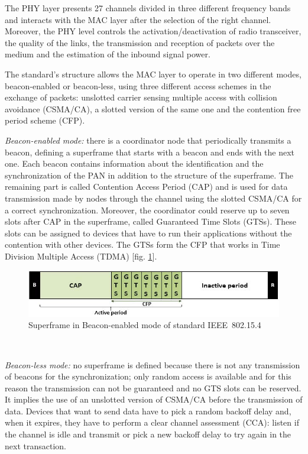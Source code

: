 \documentclass[conference]{IEEEtran}
\begin{document}
The PHY layer presents 27 channels divided in three different frequency bands and interacts with the MAC layer after the selection of the right channel. Moreover, the PHY level controls the activation/deactivation of radio transceiver, the quality of the links, the transmission and reception of packets over the medium and the estimation of the inbound signal power.

The standard's structure allows the MAC layer to operate in two different modes, beacon-enabled or beacon-less, using three different access schemes in the exchange of packets: unslotted carrier sensing multiple access with collision avoidance (CSMA/CA), a slotted version of the same one and the contention free period scheme (CFP).
\newline

\textit{Beacon-enabled mode:} there is a coordinator node that periodically transmits a beacon, defining a superframe that starts with a beacon and ends with the next one. Each beacon contains information about the identification and the synchronization of the PAN in addition to the structure of the superframe. The remaining part is called Contention Access Period (CAP) and is used for data transmission made by nodes through the channel using the slotted CSMA/CA for a correct synchronization. Moreover, the coordinator could reserve up to seven slots after CAP in the superframe, called Guaranteed Time Slots (GTSs). These slots can be assigned to devices that have to run their applications without the contention with other devices. The GTSs form the CFP that works in Time Division Multiple Access (TDMA) [fig. \ref{fig_beaconenabled}].
\newline

\begin{figure}[htbp]
	\centering
	\includegraphics[width=0.9\linewidth]{img/beaconSuperframe.jpg}
	\caption{Superframe in Beacon-enabled mode of standard IEEE~802.15.4}
	\label{fig_beaconenabled}
\end{figure}\



\textit{Beacon-less mode:} no superframe is defined because there is not any transmission of beacons for the synchronization; only random access is available and for this reason the transmission can not be guaranteed and no GTS slots can be reserved. It implies the use of an unslotted version of CSMA/CA before the transmission of data. Devices that want to send data have to pick a random backoff delay and, when it expires, they have to perform a clear channel assessment (CCA): listen if the channel is idle and transmit or pick a new backoff delay to try again in the next transaction. 
\newline
\end{document}
